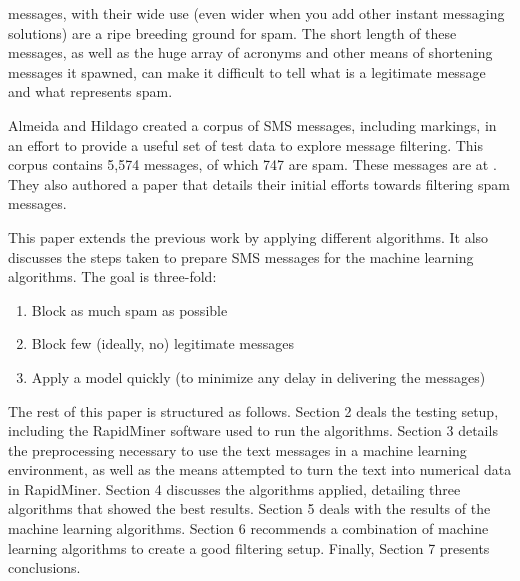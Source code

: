 \documentclass[10pt,journal,compsoc]{IEEEtran}
\begin{document}
% 
% 
% 
% 
 messages, with their wide use (even wider when you add other instant messaging solutions) are a ripe breeding ground for spam. The short length of these messages, as well as the huge array of acronyms and other means of shortening messages it spawned, can make it difficult to tell what is a legitimate message and what represents spam.

Almeida and Hildago created a corpus of SMS messages, including markings, in an effort to provide a useful set of test data to explore message filtering. This corpus contains 5,574 messages, of which 747 are spam. These messages are at \cite{SMS Collection}. They also authored a paper that details their initial efforts towards filtering spam messages. \cite{Paper}

This paper extends the previous work by applying different algorithms. It also discusses the steps taken to prepare SMS messages for the machine learning algorithms. The goal is three-fold:

\begin{enumerate}
    \item Block as much spam as possible
    \item Block few (ideally, no) legitimate messages
    \item Apply a model quickly (to minimize any delay in delivering the messages)
\end{enumerate}

The rest of this paper is structured as follows. Section 2 deals the testing setup, including the RapidMiner software used to run the algorithms. Section 3 details the preprocessing necessary to use the text messages in a machine learning environment, as well as the means attempted to turn the text into numerical data in RapidMiner. Section 4 discusses the algorithms applied, detailing three algorithms that showed the best results. Section 5 deals with the results of the machine learning algorithms. Section 6 recommends a combination of machine learning algorithms to create a good filtering setup. Finally, Section 7 presents conclusions.
\end{document}
